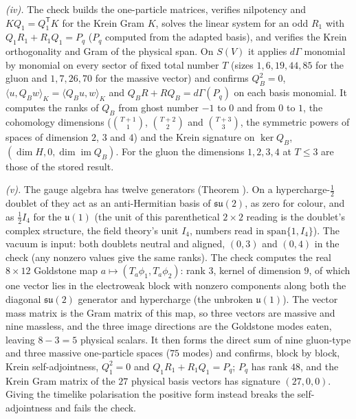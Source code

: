 \emph{(iv).} The check builds the one-particle matrices, verifies nilpotency and $KQ_1 = Q_1^{\mathsf T}K$ for the Krein Gram $K$, solves the linear system for an odd $R_1$ with $Q_1R_1 + R_1Q_1 = P_{q}$ ($P_{q}$ computed from the adapted basis), and verifies the Krein orthogonality and Gram of the physical span. On $S(V)$ it applies $d\Gamma$ monomial by monomial on every sector of fixed total number $T$ (sizes $1, 6, 19, 44, 85$ for the gluon and $1, 7, 26, 70$ for the massive vector) and confirms $Q_{B}^2 = 0$, $\langle u, Q_{B}w\rangle_K = \langle Q_{B}u, w\rangle_K$ and $Q_{B}R + RQ_{B} = d\Gamma(P_{q})$ on each basis monomial. It computes the ranks of $Q_{B}$ from ghost number $-1$ to $0$ and from $0$ to $1$, the cohomology dimensions ($\binom{T+1}{1}$, $\binom{T+2}{2}$ and $\binom{T+3}{3}$, the symmetric powers of spaces of dimension $2$, $3$ and $4$) and the Krein signature on $\ker Q_{B}$, $(\dim H, 0, \dim\operatorname{im}Q_{B})$. For the gluon the dimensions $1, 2, 3, 4$ at $T \le 3$ are those of the stored result.

\emph{(v).} The gauge algebra has twelve generators (Theorem ). On a hypercharge-$\tfrac12$ doublet of  they act as an anti-Hermitian basis of $\mathfrak{su}(2)$, as zero for colour, and as $\tfrac{1}{2}I_{4}$ for the $\mathfrak{u}(1)$ (the unit of this parenthetical $2 \times 2$ reading is the doublet's complex structure, the field theory's unit $I_{4}$, numbers read in $\mathrm{span}\{1, I_{4}\}$). The vacuum is input: both doublets neutral and aligned, $(0, 3)$ and $(0, 4)$ in the check (any nonzero values give the same ranks). The check computes the real $8 \times 12$ Goldstone map $a \mapsto (T_a\phi_1, T_a\phi_2)$: rank $3$, kernel of dimension $9$, of which one vector lies in the electroweak block with nonzero components along both the diagonal $\mathfrak{su}(2)$ generator and hypercharge (the unbroken $\mathfrak{u}(1)$). The vector mass matrix is the Gram matrix of this map, so three vectors are massive and nine massless, and the three image directions are the Goldstone modes eaten, leaving $8 - 3 = 5$ physical scalars. It then forms the direct sum of nine gluon-type and three massive one-particle spaces ($75$ modes) and confirms, block by block, Krein self-adjointness, $Q_1^2 = 0$ and $Q_1R_1 + R_1Q_1 = P_{q}$; $P_{q}$ has rank $48$, and the Krein Gram matrix of the $27$ physical basis vectors has signature $(27, 0, 0)$. Giving the timelike polarisation the positive form instead breaks the self-adjointness and fails the check.

